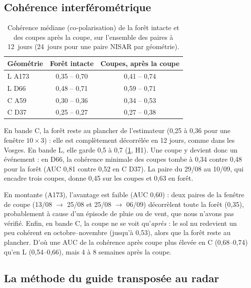 \subsection{Cohérence interférométrique}

\begin{table}[H]
\centering\small
\caption{Cohérence médiane (co-polarisation) de la forêt intacte et des coupes après la coupe, sur l'ensemble
des paires à 12~jours (24~jours pour une paire NISAR par géométrie).}
\label{tab-coh}
\begin{tabular}{lcc}
\toprule
Géométrie & Forêt intacte & Coupes, après la coupe \\
\midrule
L A173 & 0,35 -- 0,70 & 0,41 -- 0,74 \\
L D66 & 0,48 -- 0,71 & 0,59 -- 0,71 \\
C A59 & 0,30 -- 0,36 & 0,34 -- 0,53 \\
C D37 & 0,25 -- 0,27 & 0,27 -- 0,38 \\
\bottomrule
\end{tabular}
\end{table}

En bande C, la forêt reste au plancher de l'estimateur (0,25 à 0,36 pour une fenêtre $10\times3$) : elle est
complètement décorrélée en 12 jours, comme dans les Vosges. En bande L, elle garde 0,5 à 0,7
(\cref{tab-coh}, H1). Une coupe y devient donc un événement : en D66, la cohérence minimale des coupes
tombe à 0,34 contre 0,48 pour la forêt (AUC 0,81 contre 0,52 en C D37). La paire du 29/08 au 10/09, qui
encadre trois coupes, donne 0,45 sur les coupes et 0,63 en forêt.

En montante (A173), l'avantage est faible (AUC 0,60) : deux paires de la fenêtre de coupe (13/08 $\to$
25/08 et 25/08 $\to$ 06/09) décorrèlent toute la forêt (0,35), probablement à cause d'un épisode de pluie
ou de vent, que nous n'avons pas vérifié. Enfin, en bande C, la coupe ne se voit qu'\emph{après} : le sol nu
redevient un peu cohérent en octobre--novembre (jusqu'à 0,53), alors que la forêt reste au plancher. D'où une
AUC de la cohérence après coupe plus élevée en C (0,68--0,74) qu'en L (0,54--0,66), mais 4 à 8 semaines
après la coupe.

\subsection{La méthode du guide transposée au radar}

\begin{table}[H]
\centering\small
\caption{Méthode du guide sur $\Delta\gamma^0$ croisée (meilleur degré par géométrie) : matrice de confusion
en surface, part des coupes trouvées (au moins 25~\% de leurs pixels) et fausses alertes en part de la forêt.}
\label{tab-guide}
\resizebox{\linewidth}{!}{}
\end{table}

